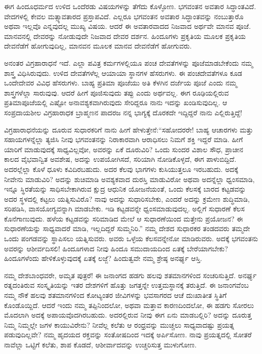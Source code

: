 \vskip 4pt

ಈಗ ಹಿಂದೂಧರ್ಮದ ಉಳಿದ ಒಂದೆರಡು ವಿಷಯಗಳನ್ನು ತೆಗೆದು ಕೊಳ್ಳೋಣ. ಭಗವಂತನ ಅವತಾರ ಸಿದ್ಧಾಂತವಿದೆ. ವೇದಗಳಲ್ಲಿ ಕೇವಲ ಮತ್ಸ್ಯಾವತಾರದ ಪ್ರಸ್ತಾಪವಿದೆ. ಎಲ್ಲರೂ ಭಗವಂತನ ಅವತಾರ ಸಿದ್ಧಾಂತವನ್ನು ನಂಬುತ್ತಾರೊ ಅಥವಾ ಇಲ್ಲವೊ ಎನ್ನವುದಲ್ಲ ಮುಖ್ಯ ವಿಷಯ. ಆದರೆ ಈ ಅವತಾರವಾದದ ನಿಜವಾದ ಅರ್ಥವೇ ಮಾನವ ಪೂಜೆ. ಮಾನವನಲ್ಲಿ ದೇವರನ್ನು ನೋಡುವುದೇ ನಿಜವಾದ ದೇವರ ದರ್ಶನ. ಹಿಂದೂಗಳು ಪ್ರಕೃತಿಯ ಮೂಲಕ ಪ್ರಕೃತಿಯ ದೇವನೆಡೆಗೆ ಹೋಗುವುದಿಲ್ಲ, ಮಾನವನ ಮೂಲಕ ಮಾನವ ದೇವನೆಡೆಗೆ ಹೋಗುವರು.

\vskip 4pt

ಅನಂತರ ವಿಗ್ರಹಾರಾಧನೆ ಇದೆ. ಎಲ್ಲಾ ಪವಿತ್ರ ಕರ್ಮಗಳಲ್ಲಿಯೂ ಪಂಚ ದೇವತೆಗಳನ್ನು ಪೂಜೆಮಾಡಬೇಕೆಂದು ನಮ್ಮ ಶಾಸ್ತ್ರ ವಿಧಿಸಿರುವುದು. ಉಳಿದ ದೇವತೆಗಳೆಲ್ಲ ಆಯಾಯಾ ಸ್ಥಾನಗಳ ಹೆಸರುಗಳು. ಈ ಪಂಚದೇವತೆಗಳೂ ಕೂಡ ಒಂದೇದೇವರ ವಿವಿಧ ಹೆಸರುಗಳು. ಬಾಹ್ಯ ಪ್ರತಿಮಾ ಪೂಜೆಯು ಅತಿ ಕೆಳಗಿನ ದರ್ಜೆಯ ಪೂಜೆ ಎಂದು ನಮ್ಮ ಶಾಸ್ತ್ರಗಳೆಲ್ಲಾ ಸಾರುವುವು. ಆದರೆ ಹೀಗೆ ಪೂಜಿಸುವುದು ತಪ್ಪು ಎಂದು ಅರ್ಥವಲ್ಲ. ಈಗ ರೂಢಿಯಲ್ಲಿರುವ ಪ್ರತಿಮಾಪೂಜೆಯಲ್ಲಿ ಎಷ್ಟೋ ಅನಾವಶ್ಯಕವಾಗಿರುವುದು ಸೇರಿದ್ದರೂ ನಾನು ಇದನ್ನು ಖಂಡಿಸುವುದಿಲ್ಲ. ಆ ಸಂಪ್ರದಾಯಶೀಲ ವಿಗ್ರಹಾರಾಧಕ ಬ್ರಾಹ್ಮಣನ ಪಾದರಜ ನನ್ನ ಭಾಗ್ಯಕ್ಕೆ ದೊರಕದೇ ಇದ್ದಿದ್ದರೆ ನಾನು ಎಲ್ಲಿರುತ್ತಿದ್ದೆ!

\vskip 4pt

ವಿಗ್ರಹಾರಾಧನೆಯನ್ನು ದೂರುವ ಸುಧಾರಕರಿಗೆ ನಾನು ಹೀಗೆ ಹೇಳುತ್ತೇನೆ:\break “ಸಹೋದರರೇ! ಬಾಹ್ಯ ಆಚಾರಗಳು ಮತ್ತು ಸಹಾಯಗಳನ್ನೆಲ್ಲಾ ತ್ಯಜಿಸಿ ನೀವು ಭಗವಂತನನ್ನು ನಿರಾಕಾರವಾಗಿ ಆರಾಧಿಸಲು ನಿಮಗೆ ಶಕ್ತಿ ಇದ್ದರೆ ಮಾಡಿ. ಹೀಗೆ ಯಾರಿಗೆ ಮಾಡುವುದಕ್ಕೆ ಸಾಧ್ಯವಿಲ್ಲವೋ, ಅವರನ್ನು ಏಕೆ ದೂರುವಿರಿ? ಒಂದು ಸುಂದರ ವಿಶಾಲ ಸೌಧ, ಪ್ರಾಚೀನ ಕಾಲದ ವೈಭವಾನ್ವಿತ ಅವಶೇಷ, ಅದನ್ನು ಉಪಯೋಗಿಸದೆ, ಸರಿಯಾಗಿ ನೋಡಿಕೊಳ್ಳದೆ, ಈಗ ಪಾಳುಬಿದ್ದಿದೆ. ಅದರಲ್ಲೆಲ್ಲಾ ಕೊಳೆ ಧೂಳು ಕವಿದಿರಬಹುದು. ಅದರ ಕೆಲವು ಭಾಗಗಳು ಕುಸಿಯುತ್ತಲೂ ಇರಬಹುದು. ಅದಕ್ಕೆ ನೀವೇನು ಮಾಡುವಿರಿ? ಅದನ್ನು ಶುಚಿಮಾಡಿ ಅವಶ್ಯಕವಾದ ದುರಸ್ತಿ ಮಾಡುವಿರೋ ಅಥವಾ ಅದನ್ನೆಲ್ಲಾ ಧ್ವಂಸಮಾಡಿ, ಇನ್ನೂ ಸ್ಥಿರತೆಯನ್ನು ಸಾಧಿಸಬೇಕಾಗಿರುವ ಕ್ಷುದ್ರ ಆಧುನಿಕ ಯೋಜನೆಯಂತೆ, ಒಂದು ಕೆಲಸಕ್ಕೆ ಬಾರದ ಕಟ್ಟಡವನ್ನು ಅದರ ಸ್ಥಳದಲ್ಲಿ ಕಟ್ಟಲು ಯತ್ನಿಸುವಿರೊ? ನಾವು ಅದನ್ನು ಸುಧಾರಿಸಬೇಕು, ಎಂದರೆ ಅದನ್ನು ಕ್ರಮೇಣ ಶುದ್ಧಿಮಾಡಿ, ಸರಿಪಡಿಸಿ, ವಾಸಯೋಗ್ಯವನ್ನಾಗಿ ಮಾಡಬೇಕು. ಇಡಿ ಕಟ್ಟಡವನ್ನೇ ಧ್ವಂಸಮಾಡುವುದಲ್ಲ. ಅಲ್ಲಿಗೆ ಸುಧಾರಣೆ ಕೆಲಸ ಕೊನೆಗಾಣುವುದು. ಹಳೆಯ ಕಟ್ಟಡವನ್ನು ಸರಿಮಾಡಿದ ಮೇಲೆ ಆ ಸುಧಾರಣೆಯಿಂದ ಮತ್ತೇನು ಪ್ರಯೋಜನ? ಈ ಸುಧಾರಣೆಯನ್ನು ಸಾಧ್ಯವಾದರೆ ಮಾಡಿ, ಇಲ್ಲದಿದ್ದರೆ ಸುಮ್ಮನಿರಿ.” ನಮ್ಮ ದೇಶದ ಸುಧಾರಕರ ತಂಡದವರು ತಮ್ಮದೇ ಒಂದು ಪಂಗಡವನ್ನು ಸ್ಥಾಪಿಸಲು ಯತ್ನಿಸುವರು. ಅವರು ಒಳ್ಳೆಯ ಕೆಲಸವನ್ನೇನೋ ಮಾಡಿರುವರು. ಅದಕ್ಕೆ ಭಗವಂತನು ಅವರನ್ನು ಆಶೀರ್ವದಿಸಲಿ! ಹಿಂದೂಗಳಾದ ನೀವು ಹಿಂದೂ ಸಮುದಾಯದಿಂದ ಏತಕ್ಕೆ ಬೇರೆಯಾಗಬೇಕು? ಹಿಂದೂಗಳೆಂದು ಹೇಳಿಕೊಳ್ಳುವುದಕ್ಕೆ ಏತಕ್ಕೆ ಲಜ್ಜೆ? ಹಿಂದುತ್ವವೇ ನಮ್ಮ ಶ್ರೇಷ್ಠ ಅನರ್ಘ್ಯ ಆಸ್ತಿ.

\vskip 4pt

ನಮ್ಮ ದೇಶಬಾಂಧವರೇ, ಅಮೃತ ಪುತ್ರರೆ! ಈ ಜನಾಂಗದ ಹಡಗು ಹಲವು ಶತಮಾನಗಳಿಂದ ಸಂಚರಿಸುತ್ತಿದೆ. ಅನರ್ಘ್ಯ ರತ್ನದಂತಿರುವ ಸಂಸ್ಕೃತಿಯನ್ನು ಇತರ ದೇಶಗಳಿಗೆ ಹೊತ್ತು ಜಗತ್ತನ್ನೇ ಉತ್ತಮಸ್ಥಾನಕ್ಕೆ ತರುತ್ತಿದೆ. ಈ ಜನಾಂಗವೆಂಬ ನಮ್ಮ ನೌಕೆ ಹಲವು ಶತಮಾನಗಳಿಂದ ಕೋಟ್ಯಂತರ ಜೀವಿಗಳನ್ನು ಭವಸಾಗರದ ಆಚೆ ದುಃಖಾತೀತ ಸ್ಥಿತಿಗೆ ಕೊಂಡೊಯ್ದಿದೆ. ಆದರೆ ಇಂದು ನಮ್ಮ ತಪ್ಪಿನಿಂದಲೋ, ಅಥವಾ ಮತ್ತಾವ ಕಾರಣದಿಂದಲೋ, ಈ ಹಡಗು ಸೋರಲು ಮೊದಲಾಗಿ ಅದಕ್ಕೆ ಅಪಾಯವೊದಗಿರಬಹುದು. ಅದರಲ್ಲಿರುವ ನೀವು ಈಗ ಏನು ಮಾಡಬಲ್ಲಿರಿ? ಅದನ್ನು ದೂರುತ್ತ ನಿಮ್ಮ ನಿಮ್ಮಲ್ಲೇ ಜಗಳ ಕಾಯುವಿರೇನು? ನೀವೆಲ್ಲ ಕಲೆತು ಆ ರಂಧ್ರವನ್ನು ಮುಚ್ಚಲು ಸಾಧ್ಯವಾದಷ್ಟು ಪ್ರಯತ್ನ ಪಡುವುದಿಲ್ಲವೇ? ನಮ್ಮ ಹೃದಯದ ರಕ್ತವನ್ನು ಸಂತೋಷದಿಂದ ಇದಕ್ಕೆ ಅರ್ಪಿಸೋಣ. ನಾವು ಪ್ರಯತ್ನದಲ್ಲಿ ಸೋತರೆ ನಾವೆಲ್ಲಾ ಒಟ್ಟಿಗೆ ಕಲೆತು, ಶಾಪ ಕೊಡದೆ, ಆಶೀರ್ವಾದವನ್ನು ಉಚ್ಚರಿಸುತ್ತ ಮುಳುಗೋಣ.

